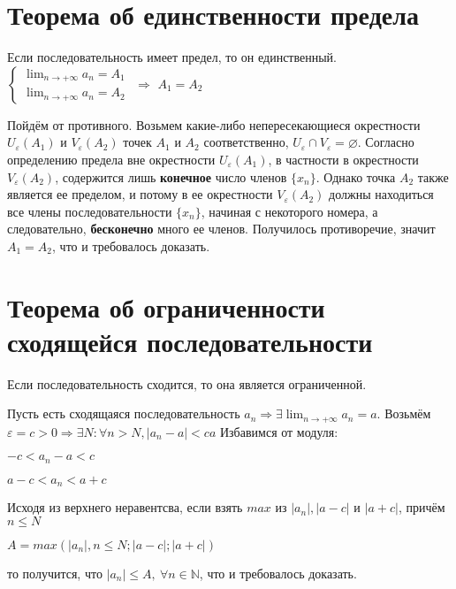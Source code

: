 \section{Теорема об единственности предела}
\begin{theorem}
Если последовательность имеет предел, то он единственный.\newline
$\begin{cases}\displaystyle \lim_{n \to +\infty} a_n = A_1 \\ \displaystyle \lim_{n \to +\infty} a_n = A_2\end{cases}$
$\Longrightarrow$ \qquad $\displaystyle A_1 = A_2$
\end{theorem}
Пойдём от противного. Возьмем какие-либо непересекающиеся окрестности $U_{\varepsilon}(A_1)$ и $V_{\varepsilon}(A_2)$ точек $A_1$ и $A_2$ соответственно, $U_{\varepsilon} \cap V_{\varepsilon} = \varnothing$.\newline
Согласно определению предела вне окрестности $U_{\varepsilon}(A_1)$, в частности в окрестности $V_{\varepsilon}(A_2)$, содержится лишь \textbf{конечное} число членов $\{x_n\}$. Однако точка $A_2$ также является ее пределом, и потому в ее окрестности $V_{\varepsilon}(A_2)$ должны находиться все члены последовательности $\{x_n\}$, начиная с некоторого номера, а следовательно, \textbf{бесконечно} много ее членов. Получилось противоречие, значит $A_1 = A_2$, что и требовалось доказать.

\section[Т. об огр. сход. посл.]{Теорема об ограниченности сходящейся последовательности}
\begin{theorem}
Если последовательность сходится, то она является ограниченной.
\end{theorem}
Пусть есть сходящаяся последовательность $a_n \Rightarrow \exists \displaystyle \lim_{n \to +\infty} a_n = a$. \newline 
Возьмём $\varepsilon = c > 0  \Rightarrow \exists N : \forall n > N, |a_n - a| < ca$ \newline
Избавимся от модуля: 
\begin{center} $-c < a_n - a < c$ \end{center}
\begin{center} $a - c < a_n < a + c$ \end{center}
Исходя из верхнего неравентсва, если взять $max$ из $|a_n|, |a - c|$ и $|a + c|$, причём $n \leq N$
\begin{center} $A = max(|a_n|, n \leq N; |a - c|; |a + c|)$ \end{center}
то получится, что $|a_n| \leq A, \ \forall n \in \mathbb{N}$, что и требовалось доказать.

